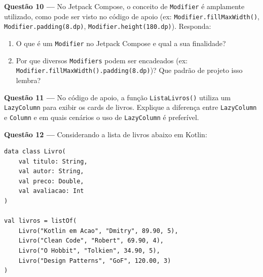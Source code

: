 \documentclass[12pt,a4paper]{article}
\newcommand{\resposta}[1]{
\noindent
\framebox[\textwidth]{
\begin{minipage}{0.98\textwidth}
\vspace*{#1}\null
\end{minipage}
}
}
\begin{document}
\vspace{0.3cm}
\resposta{5cm}

\vspace{0.5cm}

\textbf{Questão 10 —} No Jetpack Compose, o conceito de \texttt{Modifier} é amplamente utilizado, como pode ser visto no código de apoio (ex: \texttt{Modifier.fillMaxWidth()}, \texttt{Modifier.padding(8.dp)}, \texttt{Modifier.height(180.dp)}). Responda:

\begin{enumerate}[label=\alph*)]
    \item O que é um \texttt{Modifier} no Jetpack Compose e qual a sua finalidade?
    \item Por que diversos \texttt{Modifiers} podem ser encadeados (ex: \texttt{Modifier.fillMaxWidth().padding(8.dp)})? Que padrão de projeto isso lembra?
\end{enumerate}

\vspace{0.3cm}
\resposta{6cm}

\vspace{0.5cm}

\textbf{Questão 11 —} No código de apoio, a função \texttt{ListaLivros()} utiliza um \texttt{LazyColumn} para exibir os cards de livros. Explique a diferença entre \texttt{LazyColumn} e \texttt{Column} e em quais cenários o uso de \texttt{LazyColumn} é preferível.

\vspace{0.3cm}
\resposta{5cm}

\vspace{0.5cm}

\textbf{Questão 12 —} Considerando a lista de livros abaixo em Kotlin:

\begin{lstlisting}[basicstyle=\small\ttfamily, breaklines=true]
data class Livro(
    val titulo: String,
    val autor: String,
    val preco: Double,
    val avaliacao: Int
)

val livros = listOf(
    Livro("Kotlin em Acao", "Dmitry", 89.90, 5),
    Livro("Clean Code", "Robert", 69.90, 4),
    Livro("O Hobbit", "Tolkien", 34.90, 5),
    Livro("Design Patterns", "GoF", 120.00, 3)
)
\end{lstlisting}
\end{document}
